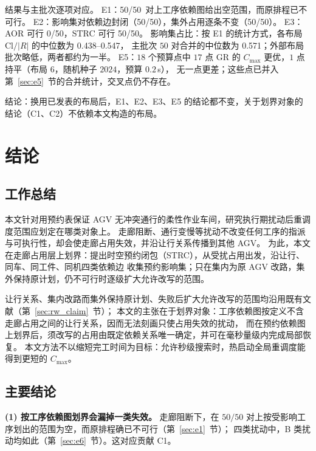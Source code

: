 \documentclass[manuscript,screen,review]{acmart}
\providecommand{\STRC}{\textsc{STRC}}
\newcommand{\NPairs}{50}
\newcommand{\PassMiss}{\NPairs/\NPairs}      %
\newcommand{\EoneFracMed}{0.571}    %
\newcommand{\NPubPairs}{50}
\newcommand{\PubPassMiss}{\NPubPairs/\NPubPairs}
\newcommand{\PubFeasRone}{0/\NPubPairs}
\newcommand{\PubFeasRtwo}{\NPubPairs/\NPubPairs}
\newcommand{\PubPassClosed}{\NPubPairs/\NPubPairs}
\newcommand{\PubPassInvar}{\NPubPairs/\NPubPairs}
\newcommand{\PubEoneFracLo}{0.438}
\newcommand{\PubEoneFracHi}{0.547}
\begin{document}
结果与主批次逐项对应。
E1：\PubPassMiss\ 对上工序依赖图给出空范围，而原排程已不可行。
E2：影响集对依赖边封闭（\PubPassClosed），集外占用逐条不变（\PubPassInvar）。
E3：AOR 可行 \PubFeasRone，\STRC{} 可行 \PubFeasRtwo。
影响集占比：按 E1 的统计方式，各布局 \(\mathrm{Cl}/|R|\) 的中位数为 \PubEoneFracLo--\PubEoneFracHi，
主批次 \(\NPairs\) 对合并的中位数为 \EoneFracMed；外部布局批次略低，两者都约为一半。
E5：\(18\) 个预算点中 \(17\) 点 GR 的 \(C_{\max}\) 更优，\(1\) 点持平（布局 6，随机种子 \(2024\)，预算 \(0.2\)\,s），
无一点更差；这些点已并入第~\ref{sec:e5}~节的合并统计，交叉点仍不存在。

结论：换用已发表的布局后，E1、E2、E3、E5 的结论都不变，关于划界对象的结论（C1、C2）不依赖本文构造的布局。

\section{结论}
\label{sec:conclusion}

\subsection{工作总结}

本文针对用预约表保证 AGV 无冲突通行的柔性作业车间，研究执行期扰动后重调度范围应划定在哪类对象上。
走廊阻断、通行变慢等扰动不改变任何工序的指派与可执行性，却会使走廊占用失效，并沿让行关系传播到其他 AGV。
为此，本文在走廊占用层上划界：提出时空预约闭包（\STRC{}），从受扰占用出发，沿让行、同车、同工件、同机四类依赖边
收集预约影响集；只在集内为原 AGV 改路，集外保持原计划，仍不可行时逐级扩大允许改写的范围。

让行关系、集内改路而集外保持原计划、失败后扩大允许改写的范围均沿用既有文献（第~\ref{sec:rw_claim}~节）；
本文的主张在于划界对象：工序依赖图按定义不含走廊占用之间的让行关系，因而无法刻画只使占用失效的扰动，
而在预约依赖图上划界后，须改写的占用由既定依赖关系唯一确定，并可在毫秒量级内完成局部恢复。
本文方法不以缩短完工时间为目标：允许秒级搜索时，热启动全局重调度能得到更短的 \(C_{\max}\)。

\subsection{主要结论}

\textbf{(1) 按工序依赖图划界会漏掉一类失效。}
走廊阻断下，在 \(\PassMiss\) 对上按受影响工序划出的范围为空，而原排程确已不可行（第~\ref{sec:e1}~节）；
四类扰动中，B 类扰动均如此（第~\ref{sec:e6}~节）。这对应贡献 C1。
\end{document}
